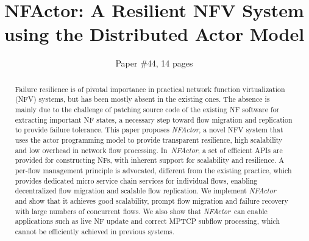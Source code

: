\documentclass{sig-alternate-10pt}
\def\nfactor{\textit{NFActor}}
\begin{document}
\title{\Large \bf NFActor: A Resilient NFV System using the Distributed Actor Model}


\author{
Paper \#44, 14 pages
}


\maketitle



\begin{abstract}

Failure resilience is of pivotal importance in practical network function virtualization (NFV) systems, but has been mostly absent in the existing ones.
The absence is mainly due to the challenge of patching source code of the existing NF software for extracting important NF states, a necessary step toward flow migration and replication to provide failure tolerance. %
 This paper proposes \nfactor, a novel NFV system that uses the actor programming model to provide transparent resilience, high scalability and low overhead in network flow processing. %
 In~\nfactor, a set of efficient APIs are provided for constructing NFs, with inherent support for scalability and resilience. A per-flow management principle is advocated, different from the existing practice, which provides dedicated micro service chain services for individual flows, enabling decentralized flow migration and scalable flow replication. %
We implement \nfactor~%
 and show that it achieves good scalability, prompt flow migration and failure recovery with large numbers of concurrent flows. 
We also show that \nfactor~can enable applications such as live NF update and correct MPTCP subflow processing, which cannot be efficiently achieved in previous systems. %


\end{abstract}
\end{document}
